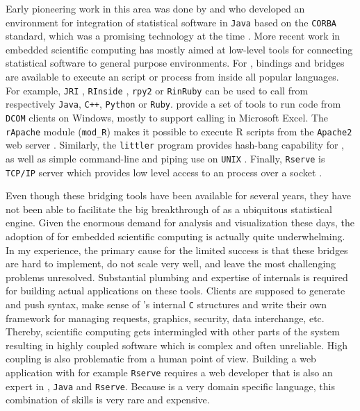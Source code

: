 Early pioneering work in this area was done by \cite{lang2000omegahat} and \cite{chambers1998distributed} who developed an environment for integration of statistical software in \texttt{Java} based on the \texttt{CORBA} standard, which was a promising technology at the time \citep{henning2006rise}. More recent work in embedded scientific computing has mostly aimed at low-level tools for connecting statistical software to general purpose environments. For \R, bindings and bridges are available to execute an \R script or process from inside all popular languages. For example, \texttt{JRI} \citep{rjava}, \texttt{RInside} \citep{eddelbuettel2011rcpp}, \texttt{rpy2} \citep{gautier2008rpy2} or \texttt{RinRuby} \citep{dahl2008rinruby} can be used to call \R from respectively \texttt{Java}, \texttt{C++}, \texttt{Python} or \texttt{Ruby}. \cite{heiberger2009r} provide a set of tools to run \R code from \texttt{DCOM} clients on Windows, mostly to support calling \R in Microsoft Excel. The \texttt{rApache} module (\texttt{mod\_R}) makes it possible to execute R scripts from the \texttt{Apache2} web server \citep{horner2013rapache}. Similarly, the \texttt{littler} program provides hash-bang capability for \R, as well as simple command-line and piping use on \texttt{UNIX} \citep{littler}. Finally, \texttt{Rserve} is \texttt{TCP/IP} server which provides low level access to an \R process over a socket \citep{urbanek2013rserve}. 

Even though these bridging tools have been available for several years, they have not been able to facilitate the big breakthrough of \R as a ubiquitous statistical engine. Given the enormous demand for analysis and visualization these days, the adoption of \R for embedded scientific computing is actually quite underwhelming. In my experience, the primary cause for the limited success is that these bridges are hard to implement, do not scale very well, and leave the most challenging problems unresolved. Substantial plumbing and expertise of \R internals is required for building actual applications on these tools. Clients are supposed to generate and push \R syntax, make sense of \R's internal \texttt{C} structures and write their own framework for managing requests, graphics, security, data interchange, etc. Thereby, scientific computing gets intermingled with other parts of the system resulting in highly coupled software which is complex and often unreliable. High coupling is also problematic from a human point of view. Building a web application with for example \texttt{Rserve} requires a web developer that is also an expert in \R, \texttt{Java} and \texttt{Rserve}. Because \R is a very domain specific language, this combination of skills is very rare and expensive. 


